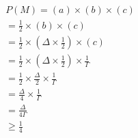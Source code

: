 \begin{align}
\label{eqn:eqn-delta-odds}
P(M) = (a) \times (b) \times (c)\\
= \frac{1}{2} \times (b) \times (c) \\
= \frac{1}{2} \times \left(\Delta \times\frac{1}{2} \right)\times (c) \\
= \frac{1}{2} \times \left(\Delta \times \frac{1}{2} \right)\times \frac{1}{\Gamma}\\
= \frac{1}{2} \times \frac{\Delta}{2} \times \frac{1}{\Gamma}\\
= \frac{\Delta}{4} \times \frac{1}{\Gamma}\\
= \frac{\Delta}{4\Gamma}\\
\ge \frac{1}{4}
\end{align} 
